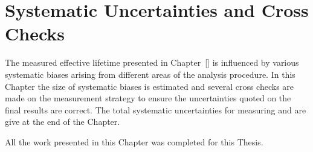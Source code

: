 \chapter{Systematic Uncertainties and Cross Checks}
\label{sec:systematics}
The measured \bsmumu effective lifetime presented in Chapter~\ref{} is influenced by various systematic biases arising from different areas of the analysis procedure. In this Chapter the size of systematic biases is estimated and several cross checks are made on the measurement strategy to ensure the uncertainties quoted on the final results are correct. The total systematic uncertainties for measuring \tmumu and \Gmumu are give at the end of the Chapter.

All the work presented in this Chapter was completed for this Thesis.

